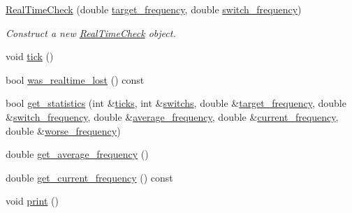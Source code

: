 \begin{DoxyCompactItemize}
\item 
\hyperlink{classreal__time__tools_1_1RealTimeCheck_a2f26472092432e628167f89a3a19e27e}{Real\+Time\+Check} (double \hyperlink{classreal__time__tools_1_1RealTimeCheck_a126c13a50d06703c515b35f87c3e867c}{target\+\_\+frequency}, double \hyperlink{classreal__time__tools_1_1RealTimeCheck_a235895032a789539a8ba957caac621ec}{switch\+\_\+frequency})
\begin{DoxyCompactList}\small\item\em Construct a new \hyperlink{classreal__time__tools_1_1RealTimeCheck}{Real\+Time\+Check} object. \end{DoxyCompactList}\item 
void \hyperlink{classreal__time__tools_1_1RealTimeCheck_a83fdf97352d36aa20e482d7dfae442d5}{tick} ()
\item 
bool \hyperlink{classreal__time__tools_1_1RealTimeCheck_a88f45e9151a5709812adddbb5dd142cc}{was\+\_\+realtime\+\_\+lost} () const
\item 
bool \hyperlink{classreal__time__tools_1_1RealTimeCheck_a4d9614b08d2b4bf7162e14c473b7d491}{get\+\_\+statistics} (int \&\hyperlink{classreal__time__tools_1_1RealTimeCheck_ae2acb20d9f1e49cc35eb5505d63201aa}{ticks}, int \&\hyperlink{classreal__time__tools_1_1RealTimeCheck_acc235579eeb245f043fd188790540fa9}{switchs}, double \&\hyperlink{classreal__time__tools_1_1RealTimeCheck_a126c13a50d06703c515b35f87c3e867c}{target\+\_\+frequency}, double \&\hyperlink{classreal__time__tools_1_1RealTimeCheck_a235895032a789539a8ba957caac621ec}{switch\+\_\+frequency}, double \&\hyperlink{classreal__time__tools_1_1RealTimeCheck_a3ffb6de7e7c01a7248c2293e29b98011}{average\+\_\+frequency}, double \&\hyperlink{classreal__time__tools_1_1RealTimeCheck_a935b4c6b8ebf569e6510d47376f8499f}{current\+\_\+frequency}, double \&\hyperlink{classreal__time__tools_1_1RealTimeCheck_a3605c41d8c5c616879fa9af469860470}{worse\+\_\+frequency})
\item 
double \hyperlink{classreal__time__tools_1_1RealTimeCheck_a2b891d59055829fab442ba4c382778e3}{get\+\_\+average\+\_\+frequency} ()
\item 
double \hyperlink{classreal__time__tools_1_1RealTimeCheck_a375f76a8df6a08ea1755728391384302}{get\+\_\+current\+\_\+frequency} () const
\item 
void \hyperlink{classreal__time__tools_1_1RealTimeCheck_a9c9c68da79843098085204095286a143}{print} ()
\end{DoxyCompactItemize}

